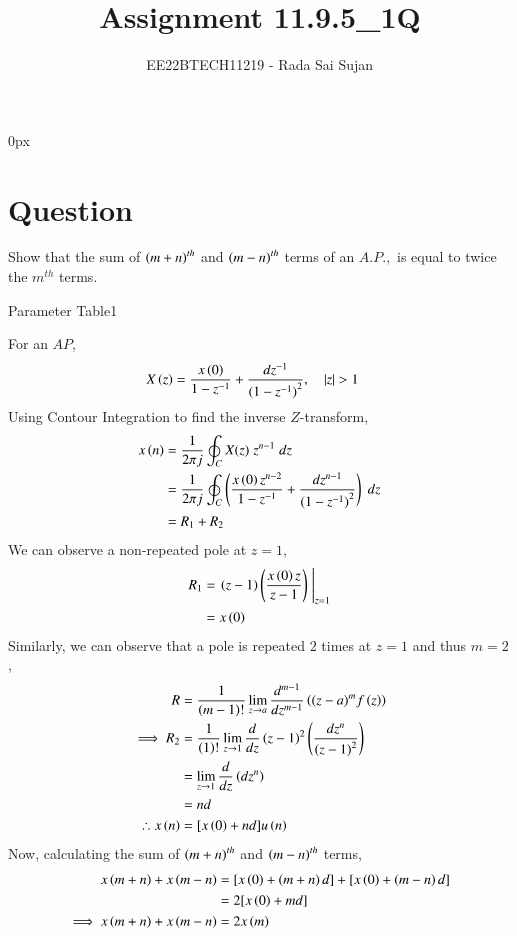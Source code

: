 \documentclass[journal,12pt,twocolumn]{IEEEtran}
\theoremstyle{remark}
\begin{document}
\parindent 0px

\title{Assignment 11.9.5\_1Q}
\author{EE22BTECH11219 - Rada Sai Sujan$^{}$%
}
\maketitle
\newpage
\bigskip
\section*{Question}
Show that the sum of $\left(m+n\right)^{th}$ and $\left(m-n\right)^{th}$ terms of an $A.P.,$ is equal to twice the $m^{th}$ terms.    \\
\solution

\begin{table}[ht]
    \centering
    \def\arraystretch{1.5}
    
    \caption{Parameter Table1}
    \label{tab:10.9.5.1}
\end{table}
For an $AP$,
\begin{align}
    X\left(z\right) &= \frac{ x\left(0\right) }{1-z^{-1}} + \frac{dz^{-1}}{{(1-z^{-1})}^{2}},\quad \left\vert z\right\vert>1
\end{align}
Using Contour Integration to find the inverse $Z$-transform,    \\
\begin{align}
    x\left(n\right)&=\frac{1}{2\pi j}\oint_{C}X(z) \;z^{n-1} \;dz  \\
    &=\frac{1}{2\pi j}\oint_{C} \left( \frac{ x\left(0\right)z^{n-2} }{1-z^{-1}} + \frac{dz^{n-1}}{{(1-z^{-1})}^{2}} \right)\;dz   \\
    &=R_1+R_2
\end{align}
We can observe a non-repeated pole at $z=1$,
\begin{align}
    R_1 &= \left.\left(z-1\right)\left(\frac{x\left(0\right)z}{z-1}\right)\;\right|_{z=1} \\
    &=x\left(0\right)
\end{align}
Similarly, we can observe that a pole is repeated $2$ times at $z=1$ and thus $m=2$,
\begin{align}
    R&=\frac{1}{\left(m-1\right)!}\lim\limits_{z\to a}\frac{d^{m-1}}{dz^{m-1}}\left({(z-a)}^{m}f\left(z\right)\right)  \\
    \implies R_2&=\frac{1}{\left(1\right)!}\lim\limits_{z\to 1}\frac{d}{dz}\left(z-1\right)^{2}\left(\frac{dz^{n}}{{(z-1)}^{2}}\right)   \\
    &= \lim\limits_{z\to 1}\frac{d}{dz}\left(dz^{n}\right)    \\
    &=nd    \\
    \therefore x\left(n\right) &= [x\left(0\right)+nd]u\left(n\right)
\end{align}
Now, calculating the sum of $\left(m+n\right)^{th}$ and $\left(m-n\right)^{th}$ terms,
\begin{align}
    x\left(m+n\right)+x\left(m-n\right)&=[x\left(0\right)+\left(m+n\right)d]+ [x\left(0\right)+\left(m-n\right)d]   \\
    &=2[x\left(0\right)+md]   \\
    \implies x\left(m+n\right)+x\left(m-n\right)&=2x\left(m\right)
\end{align}
\end{document}
